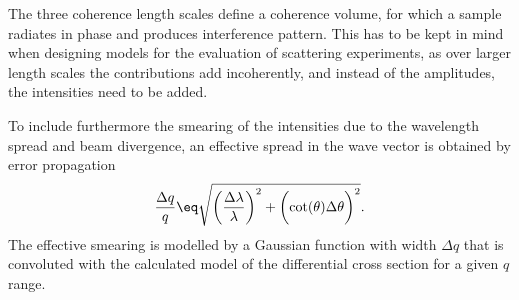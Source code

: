 \documentclass[\main/dresen_thesis.tex]{subfiles}
\begin{document}
    The three coherence length scales define a coherence volume, for which a sample radiates in phase and produces interference pattern.
    This has to be kept in mind when designing models for the evaluation of scattering experiments, as over larger length scales the contributions add incoherently, and instead of the amplitudes, the intensities need to be added.

    To include furthermore the smearing of the intensities due to the wavelength spread and beam divergence, an effective spread in the wave vector is obtained by error propagation
    \begin{align}
      \frac{\Delta q}{q} \eq \sqrt{\biggl( \frac{\Delta \lambda}{\lambda} \biggr)^2 + \biggl( \cot (\theta) \Delta \theta \biggr)^2}.
    \end{align}
    The effective smearing is modelled by a Gaussian function with width $\Delta q$ that is convoluted with the calculated model of the differential cross section for a given $q$ range.
\end{document}
